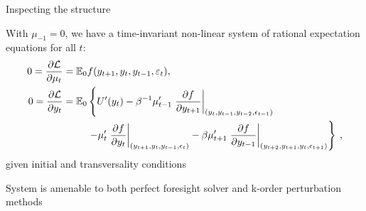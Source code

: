 \documentclass[handout,usepdftitle=false,xcolor=dvipsnames,aspectratio=169]{beamer}
\begin{document}
\begin{frame}{Inspecting the structure}
  \begin{witemize}
    \item  With $\mu_{-1}=0$, we have a time-invariant non-linear system of rational expectation equations for all $t$:
    \begin{align}
      0= \frac{\partial \mathcal{L}}{\partial \mu_t} = \mathbb{E}_0 & f(y_{t+1}, y_{t}, y_{t-1}, \varepsilon_{t}),                                                                                                                                                                                                                         \\
      0=\frac{\partial \mathcal{L}}{\partial y_t} = \mathbb{E}_0    & \left\{ U' (y_t) - \beta^{-1}\mu_{t-1} ' \left. \frac{\partial f}{\partial y_{t+1}} \right|_{\left( y_{t}, y_{t-1}, y_{t-2}, \epsilon_{t-1} \right)}\right.     \notag
      \\
                                                                    & \left. - \mu_t' \left. \frac{\partial f}{\partial y_{t}} \right|_{\left( y_{t+1}, y_{t}, y_{t-1}, \epsilon_{t} \right)} - \beta \mu_{t+1}' \left. \frac{\partial f}{\partial y_{t-1}} \right|_{\left( y_{t+2}, y_{t+1}, y_{t}, \epsilon_{t+1} \right)} \right\} \: ,
    \end{align}
    given initial and transversality conditions
    \item System is amenable to both perfect foresight solver and k-order perturbation methods
  \end{witemize}

\end{frame}
\end{document}
